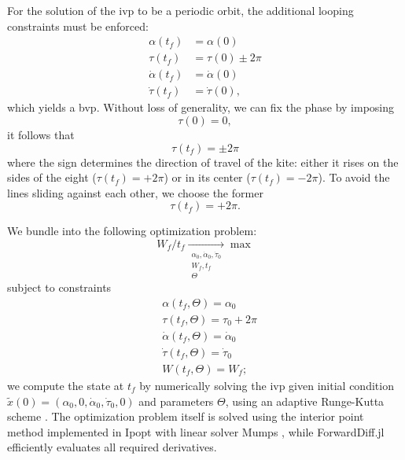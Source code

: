 For the solution of the \ac{ivp} to be a periodic orbit, the additional looping constraints must be enforced:
\begin{equation}
\begin{split}
    \alpha(t_f)      &= \alpha(0) \\
    \tau(t_f)        &= \tau(0) \pm 2\pi \\
    \dot \alpha(t_f) &= \dot \alpha(0) \\
    \dot \tau(t_f)   &= \dot \tau(0),
\end{split}
\end{equation}
which yields a \ac{bvp}. 
Without loss of generality, we can fix the phase by imposing
\begin{equation}
    \tau(0) = 0,
\end{equation}
 it follows that
\begin{equation}
    \tau(t_f) = \pm 2\pi
\end{equation}
where  the sign determines the direction of travel of the kite: either it rises on the sides of the eight (\(\tau(t_f) = +2\pi\)) or in its center (\(\tau(t_f) = -2\pi\)). To avoid the lines sliding against each other, we choose the former
\begin{equation}
    \tau(t_f) = +2\pi.
\end{equation}
\alter{<<<<<<<<<<<<<<<<<<<}

We bundle  into the following optimization problem:
\begin{equation}
W_f / t_f \underset{\substack{\alpha_0, \dot{\alpha}_0, \dot{\tau}_0 \\ W_f, t_f \\ \Theta}}{\longrightarrow} \max
\end{equation}
subject to constraints
\begin{equation}\begin{split}
    &\alpha(t_f, \Theta) = \alpha_0 \\
    &\tau(t_f, \Theta) = \tau_0 + 2\pi\\
    &\dot \alpha(t_f, \Theta) = \dot \alpha_0 \\
    &\dot \tau(t_f, \Theta) = \dot \tau_0 \\
    &W(t_f, \Theta) = W_f;
\end{split}
\end{equation}
we compute the state at \(t_f\) by numerically solving the \ac{ivp} given initial condition \(\tilde x(0) = (\alpha_0, 0, \dot \alpha_0, \dot \tau_0, 0)\) and parameters \(\Theta\), using an adaptive Runge-Kutta scheme . The optimization problem itself is solved using the interior point method implemented in Ipopt  with linear solver Mumps , while ForwardDiff.jl  efficiently  evaluates all required derivatives.

